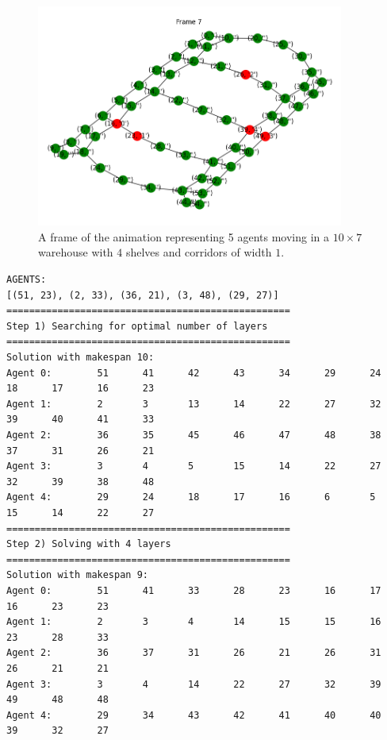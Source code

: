 \documentclass[12pt, a4paper, hidelinks]{article}
\numberwithin{equation}{section}
\begin{document}
\begin{figure}[h!]
    \centering
    \includegraphics[width=0.9\textwidth]{warehouse.png}
    \caption{A frame of the animation representing 5 agents moving in a $10 \times 7$ warehouse with $4$ shelves and corridors of width $1$.}
\end{figure}

\begin{lstlisting}[label={lst:warehouse}]
AGENTS:
[(51, 23), (2, 33), (36, 21), (3, 48), (29, 27)]
==================================================
Step 1) Searching for optimal number of layers
==================================================
Solution with makespan 10:
Agent 0:        51      41      42      43      34      29      24      18      17      16      23
Agent 1:        2       3       13      14      22      27      32      39      40      41      33
Agent 2:        36      35      45      46      47      48      38      37      31      26      21
Agent 3:        3       4       5       15      14      22      27      32      39      38      48
Agent 4:        29      24      18      17      16      6       5       15      14      22      27
==================================================
Step 2) Solving with 4 layers
==================================================
Solution with makespan 9:
Agent 0:        51      41      33      28      23      16      17      16      23      23
Agent 1:        2       3       4       14      15      15      16      23      28      33
Agent 2:        36      37      31      26      21      26      31      26      21      21
Agent 3:        3       4       14      22      27      32      39      49      48      48
Agent 4:        29      34      43      42      41      40      40      39      32      27
\end{lstlisting}
\end{document}
